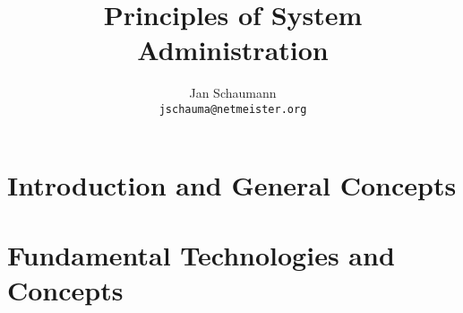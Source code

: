 

\makeindex
{}



\title{Principles of System Administration}
\author{Jan Schaumann \\
\texttt{jschauma@netmeister.org}}

\maketitle

\tableofcontents
\lstlistoflistings
{}
\listoffigures



\frontmatter



\mainmatter
\part[Introduction and General Concepts]
{Introduction and General Concepts}
\label{part:introduction}





\part[Fundamental Technologies and Concepts]
{Fundamental Technologies and Concepts}
\label{part:fundamentals}










\printglossaries
{}



\clearpage
{}
\printindex

\clearpage
{}
\printindex[names]



